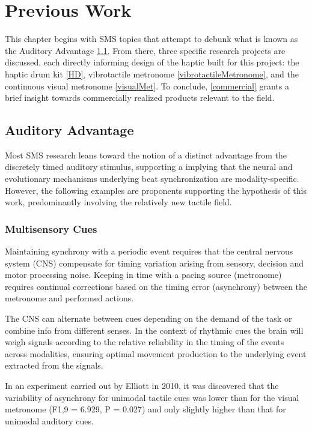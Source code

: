 \chapter{Previous Work}

This chapter begins with SMS topics that attempt to debunk what is known as the Auditory Advantage \ref{AudAdv}. From there, three specific research projects are discussed, each directly informing design of the haptic built for this project: the haptic drum kit \ref{HD}, vibrotactile metronome \ref{vibrotactileMetronome}, and the continuous visual metronome \ref{visualMet}. To conclude, \ref{commercial} grants a brief insight towards commercially realized products relevant to the field.

\section{Auditory Advantage} \label{AudAdv}
Most SMS research leans toward the notion of a distinct advantage from the discretely timed auditory stimulus, supporting a implying that the neural and evolutionary mechanisms underlying beat synchronization are modality-specific. However, the following examples are proponents supporting the hypothesis of this work, predominantly involving the relatively new tactile field.

\subsection{Multisensory Cues}
Maintaining synchrony with a periodic event requires that the central nervous system (CNS) compensate for timing variation arising from sensory, decision and motor processing noise. Keeping in time with a pacing source (metronome) requires continual corrections based on the timing error (asynchrony) between the metronome and performed actions.

The CNS can alternate between cues depending on the demand of the task or combine info from different senses. In the context of rhythmic cues the brain will weigh signals according to the relative reliability in the timing of the events across modalities, ensuring optimal movement production to the underlying event extracted from the signals. 

In an experiment carried out by Elliott in 2010, it was discovered that the variability of asynchrony for unimodal tactile cues was lower than for the visual metronome (F1,9 = 6.929, P = 0.027) and only slightly higher than that for unimodal auditory cues. \cite{elliott2010multisensory}


